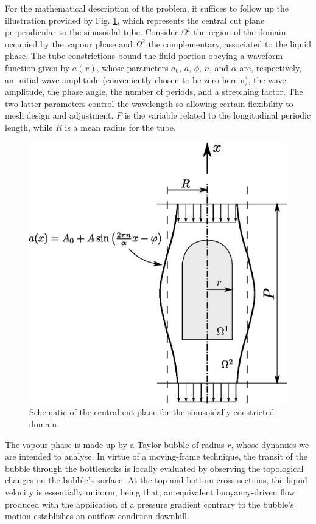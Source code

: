 \documentclass{wccm2014}
\begin{document}
For the mathematical description of the problem, it suffices to follow up the illustration provided by Fig. \ref{fig:domain}, which represents the central cut plane perpendicular to the sinusoidal tube. Consider $ \Omega^1 $ the region of the domain occupied by the vapour phase and $ \Omega^2 $ the complementary, associated to the liquid phase. The tube constrictions bound the fluid portion obeying a waveform function given by $ a(x) $, whose parameters $ a_0 $, $ a $, $ \phi $, $ n $, and $ \alpha $ are, respectively, an initial wave amplitude (conveniently chosen to be zero herein), the wave amplitude, the phase angle, the number of periods, and a stretching factor. The two latter parameters control the wavelength so allowing certain flexibility to mesh design and adjustment. $ P $ is the variable related to the longitudinal periodic length, while $ R $ is a mean radius for the tube. 
\begin{figure}
\centering
\includegraphics[scale=0.5]{figs/eps/profile-tube-bubble.eps}
\caption{\label{fig:domain}Schematic of the central cut plane for the sinusoidally constricted domain.}
\end{figure}
The vapour phase is made up by a Taylor bubble of radius $ r $, whose dynamics we are intended to analyse. In virtue of a moving-frame technique, the transit of the bubble through the bottlenecks is locally evaluated by observing the topological changes on the bubble's surface. At the top and bottom cross sections, the liquid velocity is essentially uniform, being that, an equivalent buoyancy-driven flow produced with the application of a pressure gradient contrary to the bubble's motion establishes an outflow condition downhill. 
\end{document}
